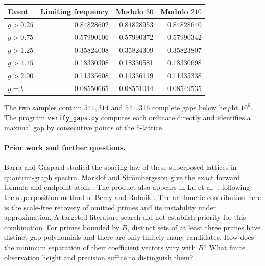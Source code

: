 \documentclass[11pt]{article}
\begin{document}
\begin{center}
\small
\begin{tabular}{@{}lrrr@{}}
\toprule
Event & Limiting frequency & Modulo $30$ & Modulo $210$\\
\midrule
$g>0.25$ & 0.84828602 & 0.84828953 & 0.84828640\\
$g>0.75$ & 0.57990106 & 0.57990372 & 0.57990342\\
$g>1.25$ & 0.35824008 & 0.35824309 & 0.35823807\\
$g>1.75$ & 0.18330308 & 0.18330581 & 0.18330698\\
$g>2.00$ & 0.11335608 & 0.11336119 & 0.11335338\\
$g=b$    & 0.08550665 & 0.08551044 & 0.08549535\\
\bottomrule
\end{tabular}
\end{center}
The two samples contain $541{,}314$ and $541{,}316$ complete gaps below height $10^6$. The program \texttt{verify\_gaps.py} computes each ordinate directly and identifies a maximal gap by consecutive points of the $5$-lattice.

\paragraph{Prior work and further questions.}
Barra and Gaspard studied the spacing law of these superposed lattices in
quantum-graph spectra. Marklof and Str\"ombergsson give the exact forward formula
and endpoint atom \cite{marklof}. The product also appears in
Lu et al.\ \cite[eqs.~(6)--(9)]{lu}, following the superposition method of
Berry and Robnik \cite{berry}. The arithmetic contribution here is the
scale-free recovery of omitted primes and its instability under approximation.
A targeted literature search did not establish priority for this combination. For primes bounded by $B$, distinct sets of at least three
primes have distinct gap polynomials and there are only finitely many candidates.
How does the minimum separation of their coefficient vectors vary with $B$?
What finite observation height and precision suffice to distinguish them?
\end{document}
